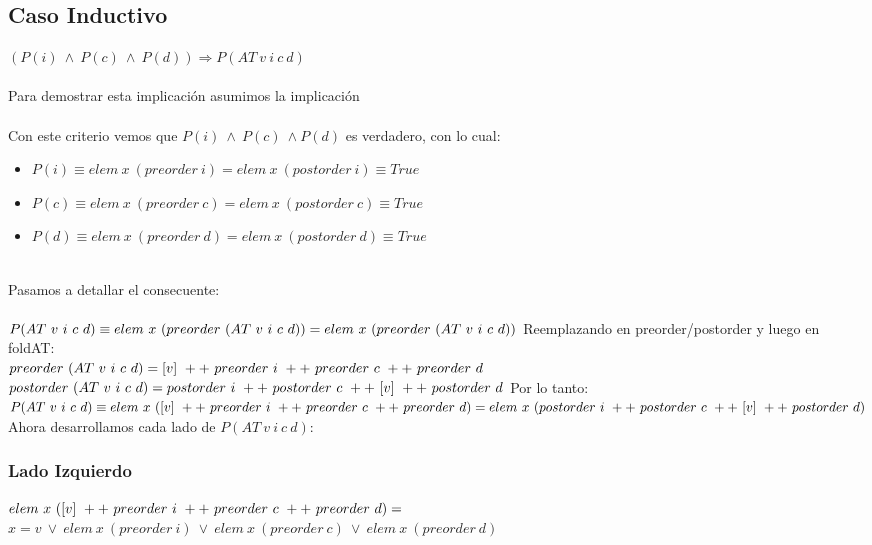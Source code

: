 \documentclass{article}
\begin{document}
\subsection{Caso Inductivo}
$(P(i)\ \land\ P(c)\ \land\ P(d))\Rightarrow P(AT\ v\ i\ c\ d)$\\\\
Para demostrar esta implicación asumimos la implicación\\\\
Con este criterio vemos que $P(i)\ \land\ P(c)\ \land P(d)$ es verdadero, con lo cual:
\begin{itemize}
    \item $P(i)\equiv elem\ x\ (preorder\ i) =elem\ x\ (postorder\ i) \equiv True$
    \item $P(c)\equiv elem\ x\ (preorder\ c) =elem\ x\ (postorder\ c) \equiv True$
    \item $P(d)\equiv elem\ x\ (preorder\ d) =elem\ x\ (postorder\ d) \equiv True$
\end{itemize}\\
Pasamos a detallar el consecuente:\\\\
$P(AT\ v\ i\ c\ d)\equiv elem\ x\ (preorder\ (AT\ v\ i\ c\ d))=elem\ x\ (preorder\ (AT\ v\ i\ c\ d))\\\\$
Reemplazando en preorder/postorder y luego en foldAT:\\
$preorder\ (AT\ v\ i\ c\ d)=[v]\ ++\ preorder\ i\ ++\ preorder\ c\ ++\ preorder\ d\\$
$postorder\ (AT\ v\ i\ c\ d)=postorder\ i\ ++\ postorder\ c\ ++\ [v]\ ++\ postorder\ d\\\\$
Por lo tanto:\\
$P(AT\ v\ i\ c\ d)\equiv\\ elem\ x\ ([v]\ ++\ preorder\ i\ ++\ preorder\ c\ ++\ preorder\ d)\\=elem\ x\ (postorder\ i\ ++\ postorder\ c\ ++\ [v]\ ++\ postorder\ d)\\\\$
Ahora desarrollamos cada lado de $P(AT\ v\ i\ c\ d)$:
\subsubsection{Lado Izquierdo}
$elem\ x\ ([v]\ ++\ preorder\ i\ ++\ preorder\ c\ ++\ preorder\ d)=\\$
$x=v\ \lor\ elem\ x\ (preorder\ i)\ \lor\ elem\ x\ (preorder\ c)\ \lor\ elem\ x\ (preorder\ d)$
\end{document}
